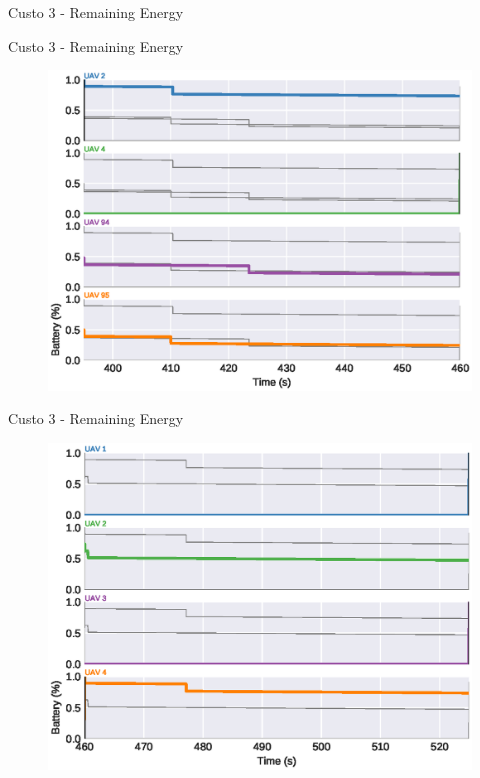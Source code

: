 \begin{frame}{Custo 3 - Remaining Energy}
\begin{figure}[!htb]
                    \end{figure}
                \end{frame}\begin{frame}{Custo 3 - Remaining Energy}
                    \begin{figure}[!htb]
                        \includegraphics[width=\textwidth]{custo_3/uav_remaining_energy_460.eps}
                    \end{figure}
                \end{frame}\begin{frame}{Custo 3 - Remaining Energy}
                    \begin{figure}[!htb]
                        \includegraphics[width=\textwidth]{custo_3/uav_remaining_energy_525.eps}

\end{figure}
\end{frame}
